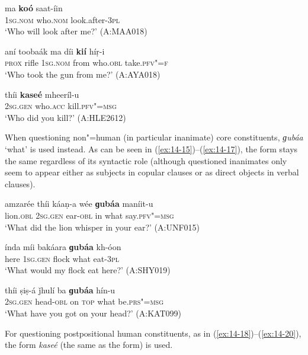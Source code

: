 \begin{exe}
\ex
\label{ex:14-12}
\gll ma \textbf{koó} saat-íin \\
\textsc{1sg}.\textsc{nom} who.\textsc{nom} look.after-\textsc{3pl} \\
\glt `Who will look after me?' (A:MAA018)

\ex
\label{ex:14-13}
\gll aní toobaák ma díi \textbf{kií} híṛ-i\\
\textsc{prox} rifle \textsc{1sg.nom} from who.\textsc{obl} take.\textsc{pfv"=f} \\
\glt `Who took the gun from me?' (A:AYA018)

\ex
\label{ex:14-14}
\gll thíi \textbf{kaseé} mheeríl-u \\
\textsc{2sg.gen} who.\textsc{acc} kill.\textsc{pfv"=msg} \\
\glt `Who did you kill?' (A:HLE2612)
\end{exe}

When questioning non"=human (in particular inanimate) core constituents, \textit{ɡubáa} `what' is used instead. As can be seen in (\ref{ex:14-15})--(\ref{ex:14-17}), the form stays the same regardless of its syntactic role (although questioned inanimates only seem to appear either as  subjects in copular clauses or as direct objects in verbal clauses).

\begin{exe}
\ex
\label{ex:14-15}
\gll amzarée thíi káaṇ-a wée \textbf{ɡubáa} maníit-u \\
lion.\textsc{obl} \textsc{2sg.gen} ear-\textsc{obl} in what say.\textsc{pfv"=msg} \\
\glt `What did the lion whisper in your ear?' (A:UNF015)

\ex
\label{ex:14-16}
\gll índa míi bakáara \textbf{ɡubáa} kh-óon \\
here \textsc{1sg.gen} flock what eat-\textsc{3pl} \\
\glt `What would my flock eat here?' (A:SHY019)

\ex
\label{ex:14-17}
\gll thíi ṣiṣ-á ǰhulí ba \textbf{ɡubáa} hín-u \\
\textsc{2sg.gen} head-\textsc{obl} on \textsc{top} what be.\textsc{prs"=msg} \\
\glt `What have you got on your head?' (A:KAT099)
\end{exe}

 For questioning postpositional human constituents, as in (\ref{ex:14-18})--(\ref{ex:14-20}), the  form \textit{kaseé} (the same as the  form) is used.

